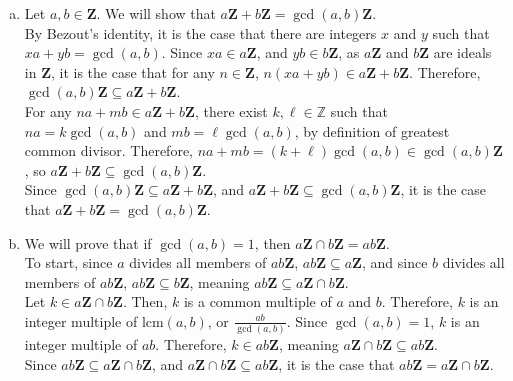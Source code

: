 \documentclass[10pt]{extarticle}
\begin{document}
\begin{enumerate}[(a)]
      Finally, we will show that $I+J$ is closed under multiplication by elements from $R$. Let $r\in R$, $a\in I+J$. Then, $a = a_i + a_j$ for $a_i\in I$ and $a_j\in J$. So,
      \begin{align*}
        ra &= r(a_i + a_j)\\
           &= ra_i + ra_j,
           \shortintertext{and}
        ar &= (a_i + a_j)r\\
           &= a_ir + a_jr,
      \end{align*}
      and since $I$ and $J$ are both ideals, $ra_i,a_ir\in I$ and $ra_j,a_jr\in J$, so $ar,ra\in I+J$.\\

      Therefore, $I+J$ is an ideal that contains $I$ and $J$.
    \item Let $a,b\in\mathbf{Z}$. We will show that $a\mathbf{Z} + b\mathbf{Z} = \gcd(a,b)\mathbf{Z}$.\\

      By Bezout's identity, it is the case that there are integers $x$ and $y$ such that $xa + yb = \gcd(a,b)$. Since $xa\in a\mathbf{Z}$, and $yb\in b\mathbf{Z}$, as $a\mathbf{Z}$ and $b\mathbf{Z}$ are ideals in $\mathbf{Z}$, it is the case that for any $n\in\mathbf{Z}$, $n(xa + yb) \in a\mathbf{Z} + b\mathbf{Z}$. Therefore, $\gcd(a,b)\mathbf{Z}\subseteq a\mathbf{Z} + b\mathbf{Z}$.\\

      For any $na + mb\in a\mathbf{Z} + b\mathbf{Z}$, there exist $k,\ell\in \mathbb{Z}$ such that $na = k\gcd(a,b)$ and $mb = \ell\gcd(a,b)$, by definition of greatest common divisor. Therefore, $na + mb = (k+\ell)\gcd(a,b)\in \gcd(a,b)\mathbf{Z}$, so $a\mathbf{Z}+b\mathbf{Z}\subseteq \gcd(a,b)\mathbf{Z}$.\\

      Since $\gcd(a,b)\mathbf{Z}\subseteq a\mathbf{Z} + b\mathbf{Z}$, and $a\mathbf{Z} + b\mathbf{Z}\subseteq \gcd(a,b)\mathbf{Z}$, it is the case that $a\mathbf{Z} + b\mathbf{Z} = \gcd(a,b)\mathbf{Z}$.
    \item We will prove that if $\gcd(a,b) = 1$, then $a\mathbf{Z}\cap b\mathbf{Z} = ab\mathbf{Z}$.\\

      To start, since $a$ divides all members of $ab\mathbf{Z}$, $ab\mathbf{Z}\subseteq a\mathbf{Z}$, and since $b$ divides all members of $ab\mathbf{Z}$, $ab\mathbf{Z}\subseteq b\mathbf{Z}$, meaning $ab\mathbf{Z}\subseteq a\mathbf{Z}\cap b\mathbf{Z}$.\\

      Let $k\in a\mathbf{Z} \cap b\mathbf{Z}$. Then, $k$ is a common multiple of $a$ and $b$. Therefore, $k$ is an integer multiple of $\text{lcm}(a,b)$, or $\frac{ab}{\gcd(a,b)}$. Since $\gcd(a,b) = 1$, $k$ is an integer multiple of $ab$. Therefore, $k\in ab\mathbf{Z}$, meaning $a\mathbf{Z}\cap b\mathbf{Z}\subseteq ab\mathbf{Z}$.\\

      Since $ab\mathbf{Z}\subseteq a\mathbf{Z}\cap b\mathbf{Z}$, and $a\mathbf{Z}\cap b\mathbf{Z} \subseteq ab\mathbf{Z}$, it is the case that $ab\mathbf{Z} = a\mathbf{Z} \cap b\mathbf{Z}$.
  \end{enumerate}
\end{document}
